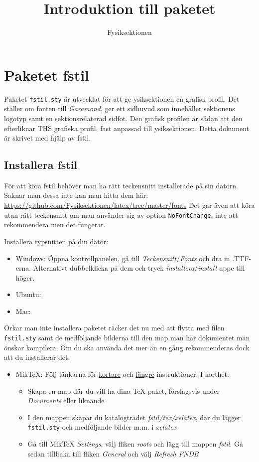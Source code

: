 \documentclass[a4paper]{article}
\title{Introduktion till paketet  \NoCaseChange{\texttt{fstil.sty}} }
\date{}
\author{Fysiksektionen}
\begin{document}
\ftitlepage
\ftoc
\section{Paketet fstil}
Paketet \texttt{fstil.sty} är utvecklat för att ge \F ysiksektionen en grafisk profil. Det ställer om fonten till \textit{Garamond}, ger ett sidhuvud som innehåller sektionens logotyp samt en sektionsrelaterad sidfot. Den grafisk profilen är sådan att den efterliknar THS grafiska profil, fast anpassad till \F ysiksektionen. Detta dokument är skrivet med hjälp av fstil.

\subsection{Installera fstil}
För att köra fstil behöver man ha rätt teckensnitt installerade på sin datorn. Saknar man dessa inte kan man hitta dem här: \href{https://github.com/Fysiksektionen/latex/tree/master/fonts}{https://github.com/Fysiksektionen/latex/tree/master/fonts}
Det går även att köra utan rätt teckensnitt om man använder sig av option \texttt{NoFontChange}, inte att rekommendera men det fungerar.

Installera typsnitten på din dator:
\begin{itemize}
\item[] Windows: Öppna kontrollpanelen, gå till \textit{Teckensnitt}/\textit{Fonts} och dra in .TTF-erna. Alternativt dubbelklicka på dem och tryck \textit{installera}/\textit{install} uppe till höger.
\item[] Ubuntu:
\item[] Mac:
\end{itemize}


Orkar man inte installera paketet räcker det nu med att flytta med filen \texttt{fstil.sty} samt de medföljande bilderna till den map man har dokumentet man önskar kompilera. Om du ska använda det mer än en gång rekommenderas dock att du installerar det:
\begin{itemize}
\item[] MikTeX: Följ länkarna för \href{http://docs.miktex.org/faq/maintenance.html#styfiles}{kortare} och \href{http://docs.miktex.org/manual/localadditions.html}{längre} instruktioner. I korthet: \begin{itemize}
\item Skapa en map där du vill ha dina \TeX-paket, förslagsvis under \textit{Documents} eller liknande
\item I den mappen skapar du katalogträdet \textit{fstil/tex/xelatex}, där du lägger \texttt{fstil.sty} och medföljande bilder m.m. i \textit{xelatex}
\item Gå till MikTeX \textit{Settings}, välj fliken \textit{roots} och lägg till mappen \textit{fstil}. Gå sedan tillbaka till fliken \textit{General} och välj \textit{Refresh FNDB}
\end{itemize}
\end{itemize}
\end{document}
